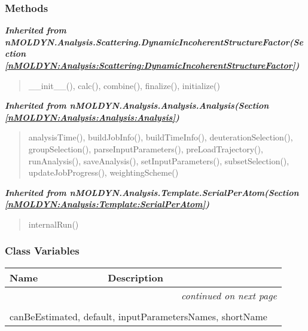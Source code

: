 
  \subsubsection{Methods}


\large{\textbf{\textit{Inherited from nMOLDYN.Analysis.Scattering.DynamicIncoherentStructureFactor\textit{(Section \ref{nMOLDYN:Analysis:Scattering:DynamicIncoherentStructureFactor})}}}}

\begin{quote}
\_\_init\_\_(), calc(), combine(), finalize(), initialize()
\end{quote}

\large{\textbf{\textit{Inherited from nMOLDYN.Analysis.Analysis.Analysis\textit{(Section \ref{nMOLDYN:Analysis:Analysis:Analysis})}}}}

\begin{quote}
analysisTime(), buildJobInfo(), buildTimeInfo(), deuterationSelection(), groupSelection(), parseInputParameters(), preLoadTrajectory(), runAnalysis(), saveAnalysis(), setInputParameters(), subsetSelection(), updateJobProgress(), weightingScheme()
\end{quote}

\large{\textbf{\textit{Inherited from nMOLDYN.Analysis.Template.SerialPerAtom\textit{(Section \ref{nMOLDYN:Analysis:Template:SerialPerAtom})}}}}

\begin{quote}
internalRun()
\end{quote}


  \subsubsection{Class Variables}

    \vspace{-1cm}
\hspace{\varindent}\begin{longtable}{|p{\varnamewidth}|p{\vardescrwidth}|l}
\cline{1-2}
\cline{1-2} \centering \textbf{Name} & \centering \textbf{Description}& \\
\cline{1-2}
\endhead\cline{1-2}\multicolumn{3}{r}{\small\textit{continued on next page}}\\\endfoot\cline{1-2}
\endlastfoot\multicolumn{2}{|l|}{\textit{Inherited from nMOLDYN.Analysis.Scattering.DynamicIncoherentStructureFactor \textit{(Section \ref{nMOLDYN:Analysis:Scattering:DynamicIncoherentStructureFactor})}}}\\
\multicolumn{2}{|p{\varwidth}|}{\raggedright canBeEstimated, default, inputParametersNames, shortName}\\
\cline{1-2}
\end{longtable}

